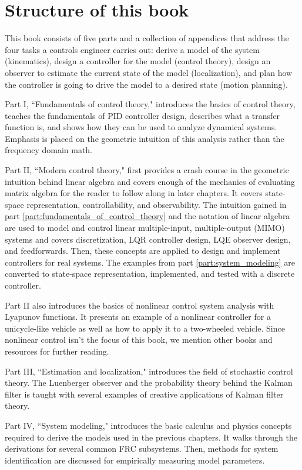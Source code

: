 \section{Structure of this book}

This book consists of five parts and a collection of appendices that address the
four tasks a controls engineer carries out: derive a model of the system
(kinematics), design a controller for the model (control theory), design an
observer to estimate the current state of the model (localization), and plan how
the controller is going to drive the model to a desired state (motion planning).

Part I, ``Fundamentals of control theory," introduces the basics of control
theory, teaches the fundamentals of PID controller design, describes what a
transfer function is, and shows how they can be used to analyze dynamical
systems. Emphasis is placed on the geometric intuition of this analysis rather
than the frequency domain math.

Part II, ``Modern control theory," first provides a crash course in the
geometric intuition behind linear algebra and covers enough of the mechanics of
evaluating matrix algebra for the reader to follow along in later chapters. It
covers state-space representation, controllability, and observability. The
intuition gained in part \ref{part:fundamentals_of_control_theory} and the
notation of linear algebra are used to model and control linear multiple-input,
multiple-output (MIMO) systems and covers discretization, LQR controller design,
LQE observer design, and feedforwards. Then, these concepts are applied to
design and implement controllers for real systems. The examples from part
\ref{part:system_modeling} are converted to state-space representation,
implemented, and tested with a discrete controller.

Part II also introduces the basics of nonlinear control system analysis with
Lyapunov functions. It presents an example of a nonlinear controller for a
unicycle-like vehicle as well as how to apply it to a two-wheeled vehicle. Since
nonlinear control isn't the focus of this book, we mention other books and
resources for further reading.

Part III, ``Estimation and localization," introduces the field of stochastic
control theory. The Luenberger observer and the probability theory behind the
Kalman filter is taught with several examples of creative applications of Kalman
filter theory.

Part IV, ``System modeling," introduces the basic calculus and physics concepts
required to derive the models used in the previous chapters. It walks through
the derivations for several common FRC subsystems. Then, methods for system
identification are discussed for empirically measuring model parameters.

